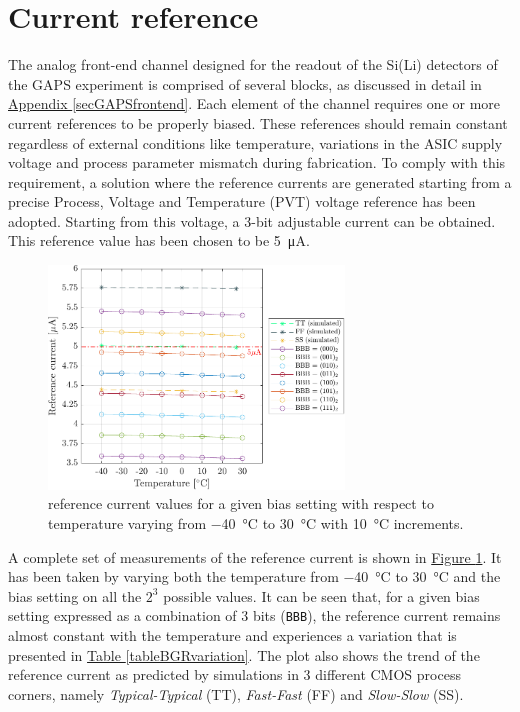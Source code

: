 
\section{Current reference}

The analog front-end channel designed for the readout of the Si(Li) detectors of the GAPS experiment is comprised of several blocks, as discussed in detail in \hyperref[secGAPSfrontend]{Appendix \ref{secGAPSfrontend}}. Each element of the channel requires one or more current references to be properly biased. These references should remain  constant regardless of external conditions like temperature, variations in the ASIC supply voltage and process parameter mismatch during fabrication. To comply with this requirement, a solution where the reference currents are generated starting from a precise Process, Voltage and Temperature (PVT) voltage reference has been adopted. Starting from this voltage, a 3-bit adjustable current can be obtained. This reference value has been chosen to be \SI{5}{\micro\ampere}.

\begin{figure}[h!]
    \centering
    \includegraphics[width=0.7\textwidth]{Images/chap1/results/BGR_current/BGR_current_Xtemp_all-BBB.pdf}
    \caption{reference current values for a given bias setting with respect to temperature varying from \SI{-40}{\celsius} to \SI{30}{\celsius} with \SI{10}{\celsius} increments.}
    \label{figBGRplotsXtempall}
\end{figure}

\par
A complete set of measurements of the reference current is shown in \hyperref[figBGRplotsXtempall]{Figure \ref{figBGRplotsXtempall}}. It has been taken by varying both the temperature from \SI{-40}{\celsius} to \SI{30}{\celsius} and the bias setting on all the $2^{3}$ possible values. It can be seen that, for a given bias setting expressed as a combination of 3 bits (\texttt{BBB}), the reference current remains almost constant with the temperature and experiences a variation that is presented in \hyperref[tableBGRvariation]{Table \ref{tableBGRvariation}}. The plot also shows the trend of the reference current as predicted by simulations in 3 different CMOS process corners, namely \textit{Typical-Typical} (TT), \textit{Fast-Fast} (FF) and \textit{Slow-Slow} (SS).

